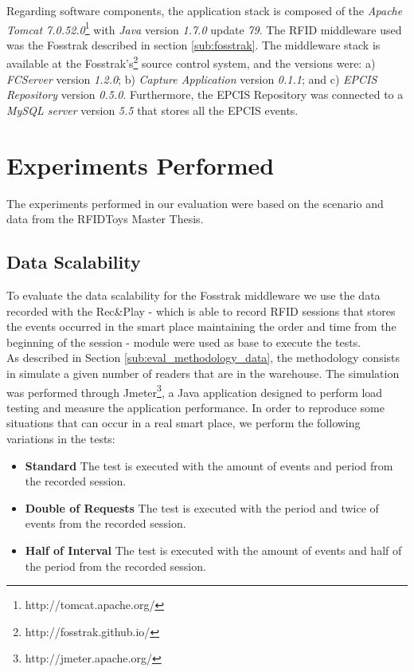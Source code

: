 Regarding software components, the application stack is composed of the \textit{Apache Tomcat 7.0.52.0}\footnote{http://tomcat.apache.org/}
with \textit{Java} version \textit{1.7.0} update \textit{79}. The \gls{RFID} middleware used was the Fosstrak
described in section \ref{sub:fosstrak}. The middleware stack is available at the Fosstrak's\footnote{http://fosstrak.github.io/}
source control system, and the versions were: a) \textit{FCServer} version \textit{1.2.0}; b) \textit{Capture Application}
version \textit{0.1.1}; and c) \textit{\gls{EPCIS} Repository} version \textit{0.5.0}. Furthermore,
the \gls{EPCIS} Repository was connected to a \textit{MySQL server} version \textit{5.5} that stores
all the \gls{EPCIS} events.

\section{Experiments Performed}
\label{sec:eval_experiments}
The experiments performed in our evaluation were based on the scenario and data from the RFIDToys\cite{Correia:Thesis:2014}
Master Thesis.

\subsection{Data Scalability}
\label{sub:eval_exp_data}
To evaluate the data scalability for the Fosstrak middleware we use the data recorded with the Rec\&Play
- which is able to record \gls{RFID} sessions that stores the events occurred in the smart place
maintaining the order and time from the beginning of the session - module were used as base to execute
the tests.\\

As described in Section \ref{sub:eval_methodology_data}, the methodology consists in simulate a given
number of readers that are in the warehouse. The simulation was performed through Jmeter\footnote{http://jmeter.apache.org/},
a Java application designed to perform load testing and measure the application performance.
In order to reproduce some situations that can occur in a real smart place, we perform the following
variations in the tests:

\begin{itemize}
  \item\textbf{Standard} The test is executed with the amount of events and period from the recorded session.
  \item\textbf{Double of Requests} The test is executed with the period and twice of events from the recorded
  session.
  \item\textbf{Half of Interval} The test is executed with the amount of events and half of the period from
  the recorded session.
\end{itemize}


